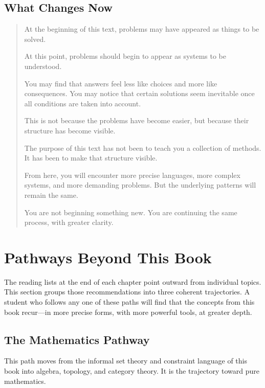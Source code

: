 \documentclass[11pt]{book}
\theoremstyle{plain}
\theoremstyle{definition}
\theoremstyle{remark}
\begin{document}
\section*{What Changes Now}

\begin{quote}
At the beginning of this text, problems may have appeared as things to
be solved.

At this point, problems should begin to appear as systems to be
understood.

You may find that answers feel less like choices and more like
consequences. You may notice that certain solutions seem inevitable
once all conditions are taken into account.

This is not because the problems have become easier, but because their
structure has become visible.

The purpose of this text has not been to teach you a collection of
methods. It has been to make that structure visible.

From here, you will encounter more precise languages, more complex
systems, and more demanding problems. But the underlying patterns will
remain the same.

You are not beginning something new. You are continuing the same
process, with greater clarity.
\end{quote}

\chapter*{Pathways Beyond This Book}

The reading lists at the end of each chapter point outward from
individual topics. This section groups those recommendations into
three coherent trajectories. A student who follows any one of these
paths will find that the concepts from this book recur---in more
precise forms, with more powerful tools, at greater depth.

\section*{The Mathematics Pathway}

This path moves from the informal set theory and constraint language of
this book into algebra, topology, and category theory. It is the
trajectory toward pure mathematics.
\end{document}
